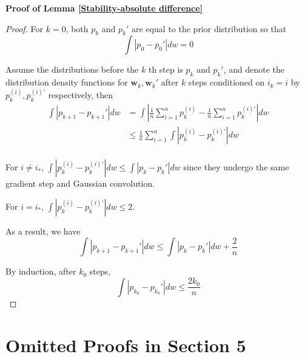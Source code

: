 \documentclass[final,12pt]{colt2018} %
\begin{document}
\noindent \textbf{Proof of Lemma \ref{Stability-absolute difference}}
\begin{proof}
  For $k=0$, both $p_k$ and $p_k'$ are equal to the prior distribution so that
\begin{equation}
  \int |p_0-p_0'|dw=0
\end{equation}

Assume the distributions before the $k$ th step is $p_k$ and $p_k'$, and denote the distribution density functions for $\bm{w}_k,\bm{w}_k'$ after $k$ steps conditioned on $i_k=i$ by $p_k^{(i)}, p_k^{(i)\prime}$ respectively, then
\begin{align*}
\int|p_{k+1}-p_{k+1}'|dw&=\int\left|\frac{1}{n}\sum_{i=1}^n p_k^{(i)}-\frac{1}{n}\sum_{i=1}^n p_k^{(i)\prime}\right|dw\\
&\le \frac{1}{n}\sum_{i=1}^n \int\left|p_k^{(i)}- p_k^{(i)\prime}\right|dw\\
\end{align*}

For $i\neq i_*$, $\int|p_k^{(i)}- p_k^{(i)\prime}|dw\le \int |p_k- p_k'|dw$ since they undergo the same gradient step and Gaussian convolution.

For $i=i_*$, $\int|p_k^{(i)}- p_k^{(i)\prime}|dw\le 2$.

As a result, we have
\begin{equation}
  \int|p_{k+1}-p_{k+1}'|dw\le \int |p_k- p_k'|dw+ \frac{2}{n}
\end{equation}

By induction, after $k_0$ steps,
\begin{equation}
\label{largeStepSize}
  \int|p_{k_0}-p_{k_0}'|dw\le \frac{2k_0}{n}
\end{equation}
\end{proof}

\section{Omitted Proofs in Section 5}
\end{document}
